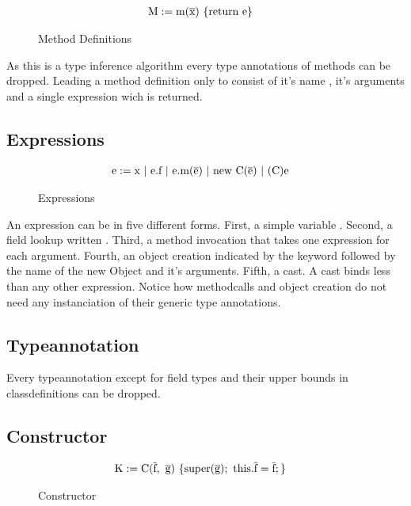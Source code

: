 \begin{figure}
    \begin{align*}
        \text{M} &:= \text{m}(\overline{\text{x}}) \ \{\text{return e}\}
    \end{align*}
    \caption{Method Definitions}
    \label{method_definitions}
\end{figure}

As this is a type inference algorithm every type annotations of methods can be dropped. Leading a method definition only to consist of it's name , it's arguments  and a single expression  wich is returned.

\subsection{Expressions}

\begin{figure}
    \begin{align*}
        \text{e} &:= \text{x} \ | \ \text{e.f} \ | \ \text{e.m(}\ot{e}\text{)} \ | \ \text{new C(}\ot{e}\text{)} \ | \ \text{(C)e}
    \end{align*}
    \caption{Expressions}
    \label{expressions}
\end{figure}

An expression  can be in five different forms. First, a simple variable . Second, a field lookup written . Third, a method invocation that takes one expression for each argument. Fourth, an object creation indicated by the keyword  followed by the name of the new Object and it's arguments. Fifth, a cast.
A cast binds less than any other expression. Notice how methodcalls and object creation do not need any instanciation of their generic type annotations.

\subsection{Typeannotation}

Every typeannotation except for field types and their upper bounds in classdefinitions can be dropped.

\subsection{Constructor}

\begin{figure}
    \begin{align*}
        \text{K} &:= \text{C}(\overline{\text{f}}, \ \overline{\text{g}}) \ \{ \text{super}(\overline{\text{g}}); \ \text{this}.\overline{\text{f}}=\overline{\text{f}}; \}
    \end{align*}
    \caption{Constructor}
    \label{constructor}
\end{figure}

